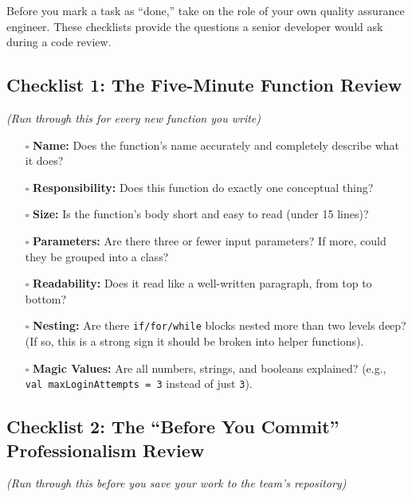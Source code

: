 \documentclass[
  letterpaper,
  DIV=11,
  numbers=noendperiod]{scrreprt}
\providecommand{\tightlist}{%
  \setlength{\itemsep}{0pt}\setlength{\parskip}{0pt}}
\begin{document}
Before you mark a task as ``done,'' take on the role of your own quality
assurance engineer. These checklists provide the questions a senior
developer would ask during a code review.

\subsection{\texorpdfstring{\textbf{Checklist 1: The Five-Minute
Function
Review}}{Checklist 1: The Five-Minute Function Review}}\label{checklist-1-the-five-minute-function-review}

\emph{(Run through this for every new function you write)}

\begin{itemize}
\tightlist
\item[$\square$]
  \textbf{Name:} Does the function's name accurately and completely
  describe what it does?
\item[$\square$]
  \textbf{Responsibility:} Does this function do exactly one conceptual
  thing?
\item[$\square$]
  \textbf{Size:} Is the function's body short and easy to read (under 15
  lines)?
\item[$\square$]
  \textbf{Parameters:} Are there three or fewer input parameters? If
  more, could they be grouped into a class?
\item[$\square$]
  \textbf{Readability:} Does it read like a well-written paragraph, from
  top to bottom?
\item[$\square$]
  \textbf{Nesting:} Are there \texttt{if/for/while} blocks nested more
  than two levels deep? (If so, this is a strong sign it should be
  broken into helper functions).
\item[$\square$]
  \textbf{Magic Values:} Are all numbers, strings, and booleans
  explained? (e.g., \texttt{val\ maxLoginAttempts\ =\ 3} instead of just
  \texttt{3}).
\end{itemize}

\subsection{\texorpdfstring{\textbf{Checklist 2: The ``Before You
Commit'' Professionalism
Review}}{Checklist 2: The ``Before You Commit'' Professionalism Review}}\label{checklist-2-the-before-you-commit-professionalism-review}

\emph{(Run through this before you save your work to the team's
repository)}
\end{document}
